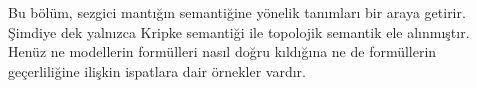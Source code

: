 


\begin{editorial}
  Bu bölüm, sezgici mantığın semantiğine yönelik tanımları bir araya getirir.
  Şimdiye dek yalnızca Kripke semantiği ile topolojik semantik ele alınmıştır.
  Henüz ne modellerin formülleri nasıl doğru kıldığına ne de formüllerin
  geçerliliğine ilişkin ispatlara dair örnekler vardır.
\end{editorial}


\OLEndChapterHook

